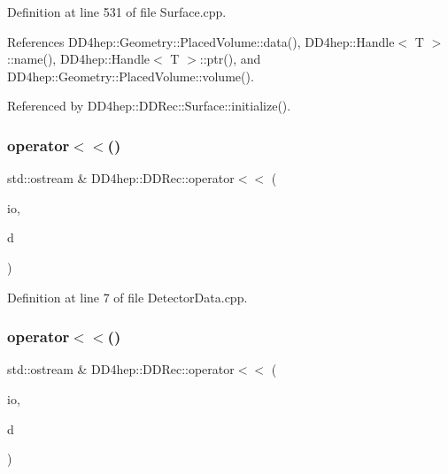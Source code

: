 Definition at line 531 of file Surface.\+cpp.



References D\+D4hep\+::\+Geometry\+::\+Placed\+Volume\+::data(), D\+D4hep\+::\+Handle$<$ T $>$\+::name(), D\+D4hep\+::\+Handle$<$ T $>$\+::ptr(), and D\+D4hep\+::\+Geometry\+::\+Placed\+Volume\+::volume().



Referenced by D\+D4hep\+::\+D\+D\+Rec\+::\+Surface\+::initialize().

\hypertarget{namespace_d_d4hep_1_1_d_d_rec_aa514e41eeafbaef792fcf63b9f571f79}{}\label{namespace_d_d4hep_1_1_d_d_rec_aa514e41eeafbaef792fcf63b9f571f79} 
\subsubsection{\texorpdfstring{operator$<$$<$()}{operator<<()}\hspace{0.1cm}{\footnotesize\ttfamily [1/7]}}
{\footnotesize\ttfamily std\+::ostream \& D\+D4hep\+::\+D\+D\+Rec\+::operator$<$$<$ (\begin{DoxyParamCaption}\item[{std\+::ostream \&}]{io,  }\item[{const \hyperlink{namespace_d_d4hep_1_1_d_d_rec_a4fe537dc27f78fad18b8182f6f167ca1}{Fixed\+Pad\+Size\+T\+P\+C\+Data} \&}]{d }\end{DoxyParamCaption})}



Definition at line 7 of file Detector\+Data.\+cpp.

\hypertarget{namespace_d_d4hep_1_1_d_d_rec_a9b0e1617bdabefc79ff68ab36353b78b}{}\label{namespace_d_d4hep_1_1_d_d_rec_a9b0e1617bdabefc79ff68ab36353b78b} 
\subsubsection{\texorpdfstring{operator$<$$<$()}{operator<<()}\hspace{0.1cm}{\footnotesize\ttfamily [2/7]}}
{\footnotesize\ttfamily std\+::ostream \& D\+D4hep\+::\+D\+D\+Rec\+::operator$<$$<$ (\begin{DoxyParamCaption}\item[{std\+::ostream \&}]{io,  }\item[{const \hyperlink{namespace_d_d4hep_1_1_d_d_rec_a33d4dff6a0b5ce47e490b050a3c5f69a}{Z\+Planar\+Data} \&}]{d }\end{DoxyParamCaption})}



